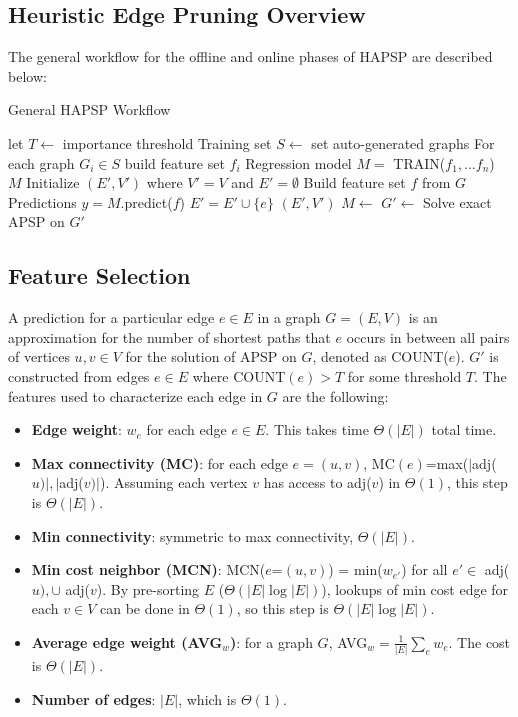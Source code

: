 \documentclass[10.5pt,journal]{IEEEtran}
\begin{document}
\subsection{Heuristic Edge Pruning Overview}
	The general workflow for the offline and online phases of HAPSP are described below:
	\begin{algorithm}
	\caption{General HAPSP Workflow}
	\begin{algorithmic}[1]
	\State let $T\leftarrow$ importance threshold
		\State Training set $S\leftarrow$ set auto-generated graphs
		\State For each graph $G_i\in S$ build feature set $f_i$
		\State Regression model $M = $ TRAIN($f_1,...f_n$)
		\State\Return $M$
	\EndProcedure
		\State Initialize $(E',V')$ where $V'=V$ and $E' = \emptyset$
		\State Build feature set $f$ from $G$
		\State Predictions $y = M$.predict($f$)
				\State $E'=E'\cup \{e\}$
			\EndIf
		\EndFor
		\State\Return $(E',V')$
	\EndProcedure
		\State $M\leftarrow$
		\State $G'\leftarrow$
		\State Solve exact APSP on $G'$
	\EndProcedure
	\end{algorithmic}
	\label{fig:alg}
	\end{algorithm}

\subsection{Feature Selection}
	A prediction for a particular edge $e\in E$ in a graph $G=(E,V)$ 
	is an approximation for the number of shortest paths 
	that $e$ occurs in between all pairs of vertices $u,v\in V$ for the solution of APSP on $G$, denoted as 
	COUNT($e$). $G'$ is constructed from edges $e\in E$ where COUNT$(e)>T$ for some threshold $T$. 
	The features used to characterize each edge in $G$ are the following: \\
	\begin{itemize}
		\item {\bf{Edge weight}}: $w_e$ for each edge $e\in E$. This takes time $\Theta(|E|)$ total time.
		\item{\bf{Max connectivity (MC)}}: for each edge $e=(u,v)$, MC$(e)$=max($|$adj($u)|,|$adj($v)|$).
			Assuming each vertex $v$ has access to adj($v$) in $\Theta(1)$, this step is $\Theta(|E|)$.
		\item{\bf{Min connectivity}}: symmetric to max connectivity, $\Theta(|E|)$. 
		\item{\bf{Min cost neighbor (MCN)}}: MCN($e$=$(u,v)$) = min($w_{e'}$) for all $e'\in$ adj($u),\cup$
			adj($v$). By pre-sorting $E$ ($\Theta(|E|\log|E|)$), lookups of min cost edge for each $v\in V$
			can be done in $\Theta(1)$, so this step is $\Theta(|E|\log|E|)$.
		\item{\bf{Average edge weight (AVG$_w$)}}: for a graph $G$, AVG$_w = \frac{1}{|E|}\sum_{e}w_e$.
			The cost is $\Theta(|E|)$.
		\item{\bf{Number of edges}}: $|E|$, which is $\Theta(1)$.
	\end{itemize}
	
\end{document}
